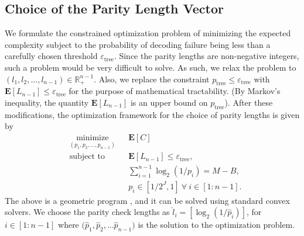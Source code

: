 \documentclass{article}
\begin{document}
\subsection{Choice of the Parity Length Vector}
\label{parityvector}
\begin{comment}
For a fixed code rate of the tree encoder (fixed number of total parity bits), allocating more parity bits at the initial stages of the tree would result in a lesser average complexity. However, doing this would result in an order increase in the probability of decoding failure. Similarly, allocating more parity bits at the later stages of the tree would result in lesser error rates, but at the expense of higher computational costs.
\end{comment}
We formulate the constrained optimization problem of minimizing the expected complexity subject to the probability of decoding failure being less than a carefully chosen threshold $\varepsilon_{\mathrm{tree}}$.
Since the parity lengths are non-negative integers, such a problem would be very difficult to solve.
As such, we relax the problem to $(l_1,l_2,\dots,l_{n-1}) \in \mathbb{R}^{n-1}_+$. Also, we replace the constraint $p_{\mathrm{tree}} \le \varepsilon_{\mathrm{tree}}$ with $ \mathbf{E}\left[L_{n-1}\right] \le \varepsilon_{\mathrm{tree}}$ for the purpose of mathematical tractability.
(By Markov's inequality, the quantity $\mathbf{E}\left[L_{n-1}\right]$ is an upper bound on $p_{\mathrm{tree}}$).
After these modifications, the optimization framework for the choice of parity lengths is given by
\begin{equation}
\begin{aligned}
& \underset{(p_1, p_2 , \dots, p_{n-1})}{\text{minimize}}
& &\mathbf{E}[C] \\
& \text{subject to}
& & \mathbf{E}\left[L_{n-1}\right] \le \varepsilon_{\mathrm{tree}}, \\
&&& \textstyle \sum_{i=1}^{n-1} \log_2\left({1}/{p_i}\right) = M-B, \\
&&& p_i \in \left[{1}/{2^{J}},1\right]~ \forall~i \in [1:n-1]. \label{optprob3}
\end{aligned}
\end{equation}
The above is a geometric program \cite{boyd2004convex}, and it can be solved using standard convex solvers.
We choose the parity check lengths as $\hat{l}_i = \left[ \log_2 \left({1}/{\hat{p}_i}\right) \right]$, for $i \in [1:n-1]$ where $\big( \hat{p}_1, \hat{p}_2, \dots \hat{p}_{n-1} \big)$ is the solution to the optimization problem.
\end{document}
